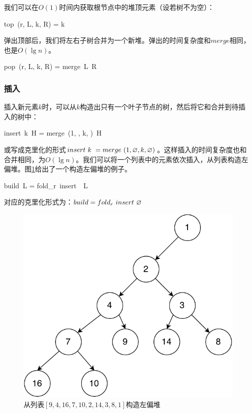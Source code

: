 \documentclass[b5paper]{ctexart}
\begin{document}
我们可以在$O(1)$时间内获取根节点中的堆顶元素（设若树不为空）：

\be
top\ (r, L, k, R) = k
\ee

弹出顶部后，我们将左右子树合并为一个新堆。弹出的时间复杂度和$merge$相同，也是$O(\lg n)$。

\be
pop\ (r, L, k, R) = merge\ L\ R
\ee

\subsubsection{插入}

插入新元素$k$时，可以从$k$构造出只有一个叶子节点的树，然后将它和合并到待插入的树中：

\be
insert\ k\ H = merge\ (1, \nil, k, \nil)\ H
\ee

或写成克里化的形式$insert\ k\ = merge\ (1, \varnothing, k, \varnothing)$。这样插入的时间复杂度也和合并相同，为$O(\lg n)$。我们可以将一个列表中的元素依次插入，从列表构造左偏堆。图\ref{fig:leftist-tree}给出了一个构造左偏堆的例子。

\be
build\ L = fold_r\ insert\ \nil\ L
\ee

对应的克里化形式为：$build = fold_r\ insert\ \nil$

\begin{figure}[htbp]
  \centering
  \includegraphics[scale=0.5]{img/leftist-tree}
  \caption{从列表$[9, 4, 16, 7, 10, 2, 14, 3, 8, 1]$构造左偏堆}
  \label{fig:leftist-tree}
\end{figure}
\end{document}
